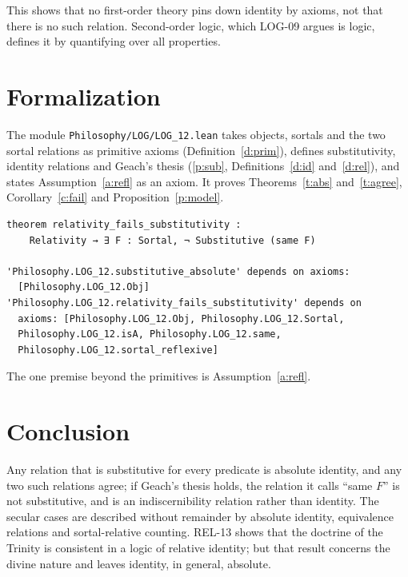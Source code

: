 \documentclass{situationist-preprint}
\begin{document}
\begin{reply}
This shows that no first-order theory pins down identity by axioms, not that there is no such relation. Second-order logic, which LOG-09 argues is logic, defines it by quantifying over all properties.
\end{reply}

\section{Formalization}

The module \nolinkurl{Philosophy/LOG/LOG_12.lean} takes objects, sortals and the two sortal relations as primitive axioms (Definition~\ref{d:prim}), defines substitutivity, identity relations and Geach's thesis (\ref{p:sub}, Definitions~\ref{d:id} and~\ref{d:rel}), and states Assumption~\ref{a:refl} as an axiom. It proves Theorems~\ref{t:abs} and~\ref{t:agree}, Corollary~\ref{c:fail} and Proposition~\ref{p:model}.

\begin{lstlisting}
theorem relativity_fails_substitutivity :
    Relativity → ∃ F : Sortal, ¬ Substitutive (same F)

'Philosophy.LOG_12.substitutive_absolute' depends on axioms:
  [Philosophy.LOG_12.Obj]
'Philosophy.LOG_12.relativity_fails_substitutivity' depends on
  axioms: [Philosophy.LOG_12.Obj, Philosophy.LOG_12.Sortal,
  Philosophy.LOG_12.isA, Philosophy.LOG_12.same,
  Philosophy.LOG_12.sortal_reflexive]
\end{lstlisting}

The one premise beyond the primitives is Assumption~\ref{a:refl}.

\section{Conclusion}

Any relation that is substitutive for every predicate is absolute identity, and any two such relations agree; if Geach's thesis holds, the relation it calls \enquote{same $F$} is not substitutive, and is an indiscernibility relation rather than identity. The secular cases are described without remainder by absolute identity, equivalence relations and sortal-relative counting. REL-13 shows that the doctrine of the Trinity is consistent in a logic of relative identity; but that result concerns the divine nature and leaves identity, in general, absolute.
\end{document}
